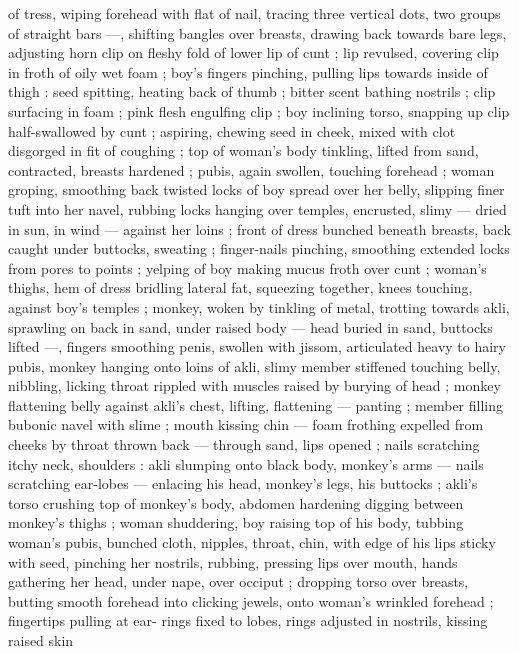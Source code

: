of tress, wiping forehead with flat of nail, tracing three vertical dots, 
two groups of straight bars ---, shifting bangles over breasts, 
drawing back towards bare legs, adjusting horn clip on fleshy fold of 
lower lip of cunt ; lip revulsed, covering clip in froth of oily wet foam 
; boy's fingers pinching, pulling lips towards inside of thigh : seed 
spitting, heating back of thumb ; bitter scent bathing nostrils ; clip 
surfacing in foam ; pink flesh engulfing clip ; boy inclining torso, 
snapping up clip half-swallowed by cunt ; aspiring, chewing seed in 
cheek, mixed with clot disgorged in fit of coughing ; top of woman's 
body tinkling, lifted from sand, contracted, breasts hardened ; pubis, 
again swollen, touching forehead ; woman groping, smoothing back 
twisted locks of boy spread over her belly, slipping finer tuft into her 
navel, rubbing locks hanging over temples, encrusted, slimy --- dried 
in sun, in wind --- against her loins ; front of dress bunched beneath 
breasts, back caught under buttocks, sweating ; finger-nails pinching, 
smoothing extended locks from pores to points ; yelping of boy 
making mucus froth over cunt ; woman's thighs, hem of dress 
bridling lateral fat, squeezing together, knees touching, against 
boy's temples ; monkey, woken by tinkling of metal, trotting towards 
akli, sprawling on back in sand, under raised body --- head buried in 
sand, buttocks lifted ---, fingers smoothing penis, swollen with 
jissom, articulated heavy to hairy pubis, monkey hanging onto loins 
of akli, slimy member stiffened touching belly, nibbling, licking throat 
rippled with muscles raised by burying of head ; monkey flattening 
belly against akli's chest, lifting, flattening --- panting ; member 
filling bubonic navel with slime ; mouth kissing chin --- foam frothing 
expelled from cheeks by throat thrown back --- through sand, lips 
opened ; nails scratching itchy neck, shoulders : akli slumping onto 
black body, monkey's arms --- nails scratching ear-lobes --- enlacing 
his head, monkey's legs, his buttocks ; akli's torso crushing top of 
monkey's body, abdomen hardening digging between monkey's 
thighs ; woman shuddering, boy raising top of his body, tubbing 
woman's pubis, bunched cloth, nipples, throat, chin, with edge of his 
lips sticky with seed, pinching her nostrils, rubbing, pressing lips 
over mouth, hands gathering her head, under nape, over occiput ; 
dropping torso over breasts, butting smooth forehead into clicking 
jewels, onto woman's wrinkled forehead ; fingertips pulling at ear- 
rings fixed to lobes, rings adjusted in nostrils, kissing raised skin 
